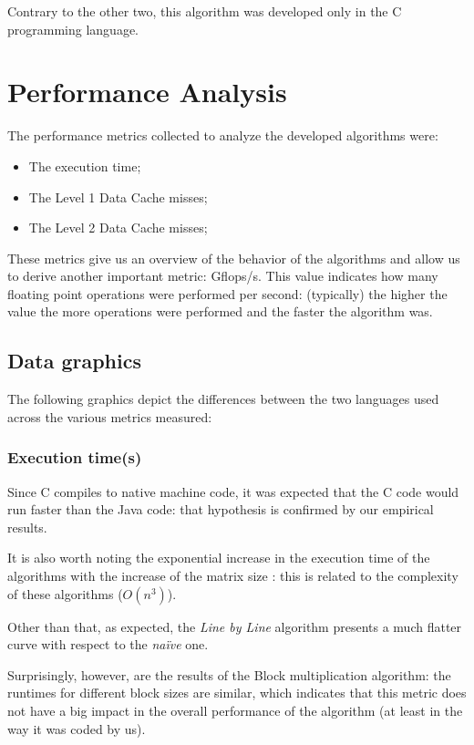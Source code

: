 \documentclass[11pt,a4paper]{article}
\begin{document}
Contrary to the other two, this algorithm was developed only in the C programming language.

\pagebreak

\section{Performance Analysis}

The performance metrics collected to analyze the developed algorithms were:

\begin{itemize}
    \item The execution time;
    \item The Level 1 Data Cache misses;
    \item The Level 2 Data Cache misses;
\end{itemize}

These metrics give us an overview of the behavior of the algorithms and allow us to derive another important metric: Gflops/s. This value indicates how many floating point operations were performed per second: (typically) the higher the value the more operations were performed and the faster the algorithm was.

\subsection{Data graphics}

The following graphics depict the differences between the two languages used across the various metrics measured:

\subsubsection{Execution time(\unit{\second})}

Since C compiles to native machine code, it was expected that the C code would run faster than the Java code: that hypothesis is confirmed by our empirical results.

It is also worth noting  the exponential increase in the execution time of the algorithms with the increase of the matrix size : this is related to the complexity of these algorithms ($O(n^3)$).

Other than that, as expected, the \emph{Line by Line} algorithm presents a much flatter curve with respect to the \emph{naïve} one.

Surprisingly, however, are the results of the Block multiplication algorithm: the runtimes for different block sizes are similar, which indicates that this metric does not have a big impact in the overall performance of the algorithm (at least in the way it was coded by us).
\end{document}
